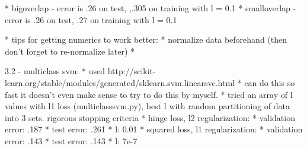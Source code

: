 \documentclass[10pt]{article}
\begin{document}
* bigoverlap - error is .26 on test, ,.305 on training with l = 0.1
* smalloverlap - error is .26 on test, .27 on training with l = 0.1

* tips for getting numerics to work better:
	* normalize data beforehand (then don't forget to re-normalize later)
	* 

3.2 - multiclass svm:
* used http://scikit-learn.org/stable/modules/generated/sklearn.svm.linearsvc.html
* can do this so fast it doesn't even make sense to try to do this by myself.
* tried an array of l values with l1 loss (multiclasssvm.py), best l with random partitioning of data into 3 sets. rigorous stopping criteria
* hinge loss, l2 regularization: 
	* validation error: .187
	* test error: .261
	* l: 0.01
* squared loss, l1 regularization:
	* validation error: .143
	* test error: .143
	* l: 7e-7
\end{document}
